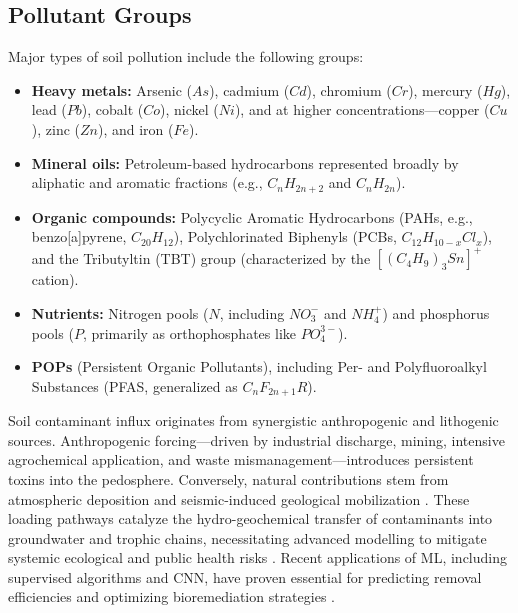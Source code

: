\documentclass[environments,article,submit,pdftex,moreauthors]{Definitions/mdpi}
\begin{document}
\subsection{Pollutant Groups}\label{sec2.1}

Major types of soil pollution include the following groups:

\begin{itemize}
    \item \textbf{Heavy metals:} Arsenic ($As$), cadmium ($Cd$), chromium ($Cr$),
        mercury ($Hg$), lead ($Pb$), cobalt ($Co$), nickel ($Ni$), and at higher
        concentrations---copper ($Cu$), zinc ($Zn$), and iron ($Fe$).
    \item \textbf{Mineral oils:} Petroleum-based hydrocarbons represented broadly
        by aliphatic and aromatic fractions (e.g., $C_nH_{2n+2}$ and $C_nH_{2n}$).
    \item \textbf{Organic compounds:} Polycyclic Aromatic Hydrocarbons (PAHs,
        e.g., benzo[a]pyrene, $C_{20}H_{12}$), Polychlorinated Biphenyls
        (PCBs, $C_{12}H_{10-x}Cl_x$), and the Tributyltin (TBT) group
        (characterized by the $[(C_4H_9)_3Sn]^+$ cation).
    \item \textbf{Nutrients:} Nitrogen pools ($N$, including $NO_3^-$ and $NH_4^+$)
        and phosphorus pools ($P$, primarily as orthophosphates like $PO_4^{3-}$).
    \item \textbf{POPs} (Persistent Organic Pollutants), including Per- and
        Polyfluoroalkyl Substances (PFAS, generalized as $C_nF_{2n+1}R$).
\end{itemize}

Soil contaminant influx originates from synergistic anthropogenic and
lithogenic sources. Anthropogenic forcing---driven by industrial discharge,
mining, intensive agrochemical application, and waste mismanagement---introduces
persistent toxins into the pedosphere. Conversely, natural contributions stem from atmospheric deposition and
seismic-induced geological mobilization \cite{Binetti2026}. These
loading pathways catalyze the hydro-geochemical transfer of contaminants into
groundwater and trophic chains, necessitating advanced modelling to mitigate
systemic ecological and public health risks \cite{Elmotawakkil2025,Sanad2026}.
Recent applications of ML, including supervised algorithms and CNN, have proven
essential for predicting removal efficiencies and optimizing bioremediation
strategies \cite{Okafor2026,Pace2026}.

\end{document}
